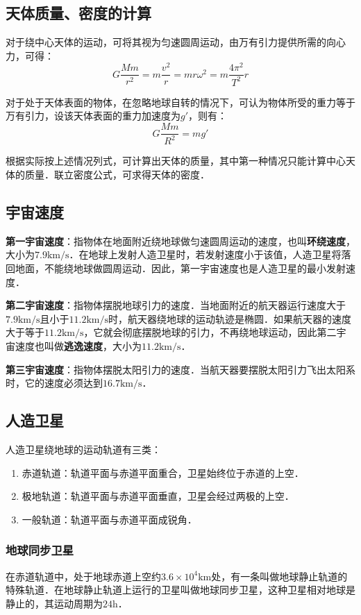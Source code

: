 \subsection{天体质量、密度的计算}

对于绕中心天体的运动，可将其视为匀速圆周运动，由万有引力提供所需的向心力，可得：
\begin{equation}
G\frac{Mm}{r^2}=m\frac{v^2}{r}=mr\omega^2=m\frac{4\pi^2}{T^2}r
\end{equation}

对于处于天体表面的物体，在忽略地球自转的情况下，可认为物体所受的重力等于万有引力，设该天体表面的重力加速度为$g'$，则有：
\begin{equation}
G\frac{Mm}{R^2}=mg'
\end{equation}

根据实际按上述情况列式，可计算出天体的质量，其中第一种情况只能计算中心天体的质量．联立密度公式，可求得天体的密度．

\subsection{宇宙速度}

\textbf{第一宇宙速度}：指物体在地面附近绕地球做匀速圆周运动的速度，也叫\textbf{环绕速度}，大小为$7.9\mathrm{km/s}$．在地球上发射人造卫星时，若发射速度小于该值，人造卫星将落回地面，不能绕地球做圆周运动．因此，第一宇宙速度也是人造卫星的最小发射速度．

\textbf{第二宇宙速度}：指物体摆脱地球引力的速度．当地面附近的航天器运行速度大于$7.9\mathrm{km/s}$且小于$11.2\mathrm{km/s}$时，航天器绕地球的运动轨迹是椭圆．如果航天器的速度大于等于$11.2\mathrm{km/s}$，它就会彻底摆脱地球的引力，不再绕地球运动，因此第二宇宙速度也叫做\textbf{逃逸速度}，大小为$11.2\mathrm{km/s}$．

\textbf{第三宇宙速度}：指物体摆脱太阳引力的速度．当航天器要摆脱太阳引力飞出太阳系时，它的速度必须达到$16.7\mathrm{km/s}$．

\subsection{人造卫星}

人造卫星绕地球的运动轨道有三类：

\begin{enumerate}
\item 赤道轨道：轨道平面与赤道平面重合，卫星始终位于赤道的上空．
\item 极地轨道：轨道平面与赤道平面垂直，卫星会经过两极的上空．
\item 一般轨道：轨道平面与赤道平面成锐角．
\end{enumerate}

\subsubsection{地球同步卫星}

在赤道轨道中，处于地球赤道上空约$3.6\times10^4\mathrm{km}$处，有一条叫做地球静止轨道的特殊轨道．在地球静止轨道上运行的卫星叫做地球同步卫星，这种卫星相对地球是静止的，其运动周期为$24\mathrm{h}$．
